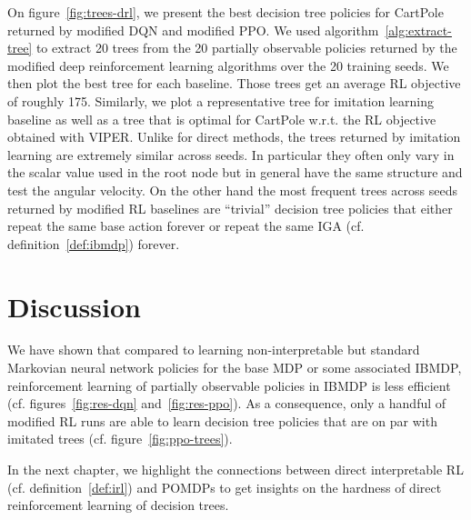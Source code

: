 On figure~\ref{fig:trees-drl}, we present the best decision tree policies for CartPole returned by modified DQN and modified PPO.
We used algorithm~\ref{alg:extract-tree} to extract 20 trees from the 20 partially observable policies returned by the modified deep reinforcement learning algorithms over the 20 training seeds.
We then plot the best tree for each baseline.
Those trees get an average RL objective of roughly 175.
Similarly, we plot a representative tree for imitation learning baseline as well as a tree that is optimal for CartPole w.r.t. the RL objective obtained with VIPER. 
Unlike for direct methods, the trees returned by imitation learning are extremely similar across seeds. In particular they often only vary in the scalar value used in the root node but in general have the same structure and test the angular velocity.
On the other hand the most frequent trees across seeds returned by modified RL baselines are ``trivial'' decision tree policies that either repeat the same base action forever or repeat the same IGA (cf. definition~\ref{def:ibmdp}) forever.


\section{Discussion}
We have shown that compared to learning non-interpretable but standard Markovian neural network policies for the base MDP or some associated IBMDP, reinforcement learning of partially observable policies in IBMDP is less efficient (cf. figures~\ref{fig:res-dqn} and~\ref{fig:res-ppo}). 
As a consequence, only a handful of modified RL runs are able to learn decision tree policies that are on par with imitated trees (cf. figure~\ref{fig:ppo-trees}).

In the next chapter, we highlight the connections between direct interpretable RL (cf. definition~\ref{def:irl}) and POMDPs to get insights on the hardness of direct reinforcement learning of decision trees.